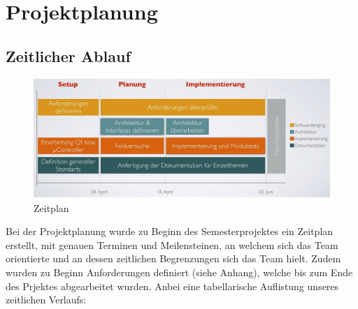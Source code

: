 \chapter{Projektplanung}
\section{Zeitlicher Ablauf}
\begin{figure}[h]
\begin{center}
  \includegraphics[width=13cm]{content/pictures/Zeitplan.jpg}
  \caption{Zeitplan}
  \label{Zeitplan}
\end{center}
\end{figure}
Bei der Projektplanung wurde zu Beginn des Semesterprojektes ein Zeitplan erstellt, mit genauen Terminen und 
Meilensteinen, an welchem sich das Team orientierte und an dessen zeitlichen Begrenzungen sich das Team hielt. 
Zudem wurden zu Beginn Anforderungen definiert (siehe Anhang), 
welche bis zum Ende des Prjektes abgearbeitet wurden.
Anbei eine tabellarische Auflistung unseres zeitlichen Verlaufs:

